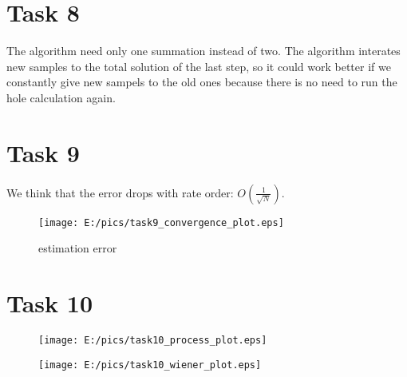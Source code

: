 \documentclass{article}
\begin{document}
\section*{Task 8}
The algorithm need only one summation instead of two. The algorithm interates new samples to the total solution of the last step, so it could work better if we constantly give new sampels to the old ones because there is no need to run the hole calculation again. 

\newpage
\section*{Task 9}
We think that the error drops with rate order: $O\left(\frac{1}{\sqrt{N}}\right)$.
\begin{figure}[htbp]
	\centering
		\texttt{[image: E:/pics/task9\_convergence\_plot.eps]}
	\caption{estimation error}
	\label{fig:task9_convergence_plot}
\end{figure}

\section*{Task 10}
\begin{figure}[htbp]
	\centering
		\texttt{[image: E:/pics/task10\_process\_plot.eps]}
	\label{fig:task10_process_plot}
\end{figure}
\begin{figure}[htbp]
	\centering
		\texttt{[image: E:/pics/task10\_wiener\_plot.eps]}
	\label{fig:task10_wiener_plot}
\end{figure}
\end{document}
